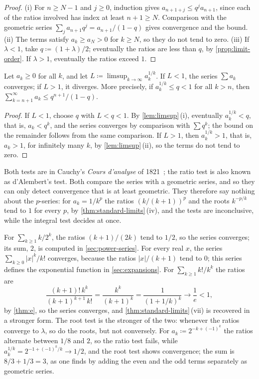 \begin{proof}
(i) For $n\ge N-1$ and $j\ge0$, induction gives $a_{n+1+j}\le q^ja_{n+1}$, since each of the ratios involved has index at least $n+1\ge N$. Comparison with the geometric series $\sum_ja_{n+1}q^j=a_{n+1}/(1-q)$ gives convergence and the bound. (ii) The terms satisfy $a_k\ge a_N>0$ for $k\ge N$, so they do not tend to zero. (iii) If $\lambda<1$, take $q\coloneqq(1+\lambda)/2$; eventually the ratios are less than $q$, by \cref{prop:limit-order}. If $\lambda>1$, eventually the ratios exceed $1$.
\end{proof}

\begin{theorem}
\label{thm:root-test}
Let $a_k\ge0$ for all $k$, and let $L\coloneqq\limsup_{k\to\infty}a_k^{1/k}$. If $L<1$, the series $\sum a_k$ converges; if $L>1$, it diverges. More precisely, if $a_k^{1/k}\le q<1$ for all $k>n$, then $\sum_{k=n+1}^\infty a_k\le q^{n+1}/(1-q)$.
\end{theorem}

\begin{proof}
If $L<1$, choose $q$ with $L<q<1$. By \cref{lem:limsup}\,(i), eventually $a_k^{1/k}<q$, that is, $a_k<q^k$, and the series converges by comparison with $\sum q^k$; the bound on the remainder follows from the same comparison. If $L>1$, then $a_k^{1/k}>1$, that is, $a_k>1$, for infinitely many $k$, by \cref{lem:limsup}\,(ii), so the terms do not tend to zero.
\end{proof}

Both tests are in Cauchy's \emph{Cours d'analyse} of 1821~\cite{cauchy1821,knopp1990}; the ratio test is also known as d'Alembert's test. Both compare the series with a geometric series, and so they can only detect convergence that is at least geometric. They therefore say nothing about the $p$-series: for $a_k=1/k^p$ the ratios $(k/(k+1))^p$ and the roots $k^{-p/k}$ tend to $1$ for every $p$, by \cref{thm:standard-limits}\,(iv), and the tests are inconclusive, while the integral test decides at once.

For $\sum_{k\ge1}k/2^k$, the ratios $(k+1)/(2k)$ tend to $1/2$, so the series converges; its sum, $2$, is computed in \cref{sec:power-series}. For every real $x$, the series $\sum_{k\ge0}|x|^k/k!$ converges, because the ratios $|x|/(k+1)$ tend to $0$; this series defines the exponential function in \cref{sec:expansions}. For $\sum_{k\ge1}k!/k^k$ the ratios are
\[
\frac{(k+1)!\,k^k}{(k+1)^{k+1}\,k!}=\frac{k^k}{(k+1)^k}=\frac1{(1+1/k)^k}\to\frac1e<1 ,
\]
by \cref{thm:e}, so the series converges, and \cref{thm:standard-limits}\,(vii) is recovered in a stronger form. The root test is the stronger of the two: whenever the ratios converge to $\lambda$, so do the roots, but not conversely. For $a_k\coloneqq2^{-k+(-1)^k}$ the ratios alternate between $1/8$ and $2$, so the ratio test fails, while $a_k^{1/k}=2^{-1+(-1)^k/k}\to1/2$, and the root test shows convergence; the sum is $8/3+1/3=3$, as one finds by adding the even and the odd terms separately as geometric series.

